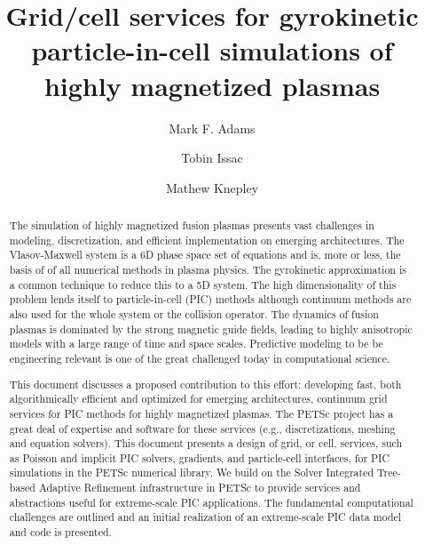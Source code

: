 \documentclass[review]{siamart}
\title{Grid/cell services for gyrokinetic particle-in-cell simulations of highly magnetized plasmas}
\author{Mark F. Adams \and Tobin Issac \and Mathew Knepley}
\begin{document}
\maketitle


\begin{abstract} 
The simulation of highly magnetized fusion plasmas presents vast challenges in modeling, discretization, and efficient implementation on emerging architectures.
The Vlasov-Maxwell system is a 6D phase space set of equations and is, more or less, the basis of of all numerical methods in plasma physics.
The gyrokinetic approximation is a common technique to reduce this to a 5D system.
The high dimensionality of this problem lends itself to particle-in-cell (PIC) methods although continuum methods are also used for the whole system or the collision operator.
The dynamics of fusion plasmas is dominated by the strong magnetic guide fields, leading to highly anisotropic models with a large range of time and space scales.
Predictive modeling to be be engineering relevant is one of the great challenged today in computational science.

This document discusses a proposed contribution to this effort: developing fast, both algorithmically efficient and optimized for emerging architectures, continuum grid services for PIC methods for highly magnetized plasmas.
The PETSc project has a great deal of expertise and software for these services (e.g., discretizations, meshing and equation solvers).
This document presents a design of grid, or cell, services, such as Poisson and implicit PIC solvers, gradients, and particle-cell interfaces, for PIC simulations in the PETSc numerical library.
We build on the Solver Integrated Tree-based Adaptive Refinement infrastructure in PETSc to provide services and abstractions useful for extreme-scale PIC applications.
The fundamental computational challenges are outlined and an initial realization of an extreme-scale PIC data model and code is presented.
\end{abstract}
\end{document}
